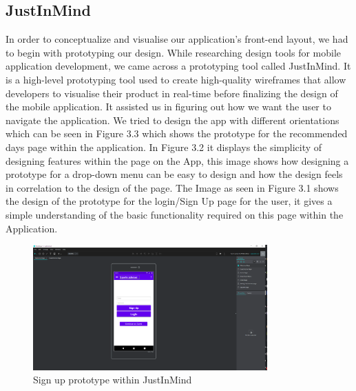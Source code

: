 \subsection{JustInMind}
In order to conceptualize and visualise our application's front-end layout, we had to begin with prototyping our design. While researching design tools for mobile application development, we came across a prototyping tool called JustInMind.
\newline
\newline
It is a high-level prototyping tool used to create high-quality wireframes that allow developers to visualise their product in real-time before finalizing the design of the mobile application. It assisted us in figuring out how we want the user to navigate the application.
\newline
\newline
We tried to design the app with different orientations which can be seen in Figure 3.3 which shows the prototype for the recommended days page within the application.
\newline
\newline
In Figure 3.2 it displays the simplicity of designing features within the page on the App, this image shows how designing a prototype for a drop-down menu can be easy to design and how the design feels in correlation to the design of the page.
\newline
\newline
The Image as seen in Figure 3.1 shows the design of the prototype for the login/Sign Up page for the user, it gives a simple understanding of the basic functionality required on this page within the Application.

\begin{figure}[H]
    \centering
    \includegraphics[width=9cm]{img/SignUpImage.PNG}
    \caption{Sign up prototype within JustInMind}
    \label{fig:Sign up prototype within JustInMind}
\end{figure}

